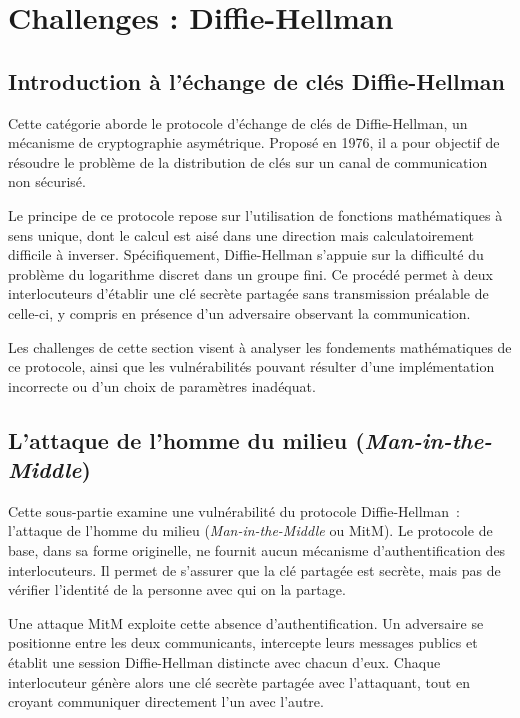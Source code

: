     \section{Challenges : Diffie-Hellman}
    \subsection{Introduction à l'échange de clés Diffie-Hellman}
    Cette catégorie aborde le protocole d'échange de clés de
    Diffie-Hellman, un mécanisme de cryptographie asymétrique.
    Proposé en 1976, il a pour objectif de résoudre le problème de la
    distribution de clés sur un canal de communication non sécurisé.

    Le principe de ce protocole repose sur l'utilisation de fonctions
    mathématiques à sens unique, dont le calcul est aisé dans une direction
    mais calculatoirement difficile à inverser. Spécifiquement, Diffie-Hellman
    s'appuie sur la difficulté du problème du logarithme discret dans
    un groupe fini. Ce procédé permet à deux interlocuteurs d'établir une clé
    secrète partagée sans transmission préalable de celle-ci, y compris en
    présence d'un adversaire observant la communication.

    Les challenges de cette section visent à analyser les fondements
    mathématiques de ce protocole, ainsi que les vulnérabilités pouvant
    résulter d'une implémentation incorrecte ou d'un choix de paramètres
    inadéquat.

    \subsection{L'attaque de l'homme du milieu (\textit{Man-in-the-Middle})}
    Cette sous-partie examine une vulnérabilité du protocole Diffie-Hellman~:
    l'attaque de l'homme du milieu (\textit{Man-in-the-Middle} ou MitM). Le protocole de
    base, dans sa forme originelle, ne fournit aucun mécanisme d'authentification
    des interlocuteurs. Il permet de s'assurer que la clé partagée est secrète,
    mais pas de vérifier l'identité de la personne avec qui on la partage.

    Une attaque MitM exploite cette absence d'authentification. Un adversaire
    se positionne entre les deux communicants, intercepte leurs messages publics
    et établit une session Diffie-Hellman distincte avec chacun d'eux. Chaque
    interlocuteur génère alors une clé secrète partagée avec l'attaquant, tout
    en croyant communiquer directement l'un avec l'autre.

